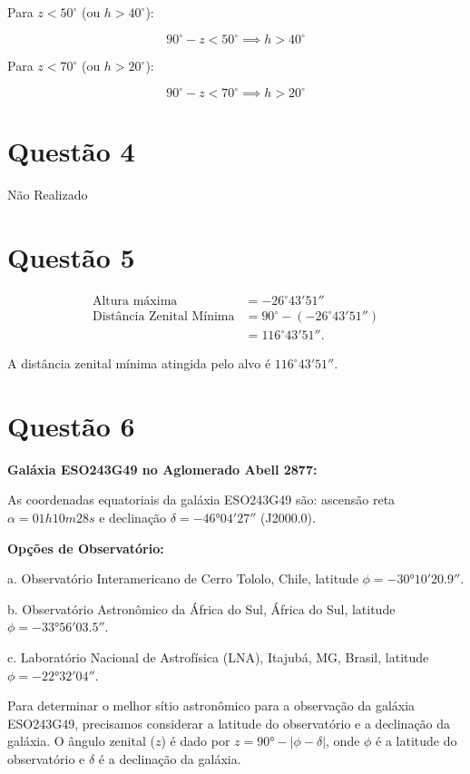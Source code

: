 \documentclass[a4paper, 12pt]{article}
\begin{document}
Para \(z < 50^\circ\) (ou \(h > 40^\circ\)):

\[
90^\circ - z < 50^\circ \implies h > 40^\circ
\]

Para \(z < 70^\circ\) (ou \(h > 20^\circ\)):

\[
90^\circ - z < 70^\circ \implies h > 20^\circ
\]

\section*{Questão 4}
Não Realizado

\section*{Questão 5}

\begin{align*}
\text{Altura máxima} &= -26^\circ 43' 51'' \\
\text{Distância Zenital Mínima} &= 90^\circ - (-26^\circ 43' 51'') \\
&= 116^\circ 43' 51''.
\end{align*}

A distância zenital mínima atingida pelo alvo é \(116^\circ 43' 51''\).

\section*{Questão 6}

\textbf{Galáxia ESO243G49 no Aglomerado Abell 2877:}

As coordenadas equatoriais da galáxia ESO243G49 são: ascensão reta \(\alpha = 01h10m28s\) e declinação \(\delta = -46°04'27''\) (J2000.0).

\textbf{Opções de Observatório:}

a. Observatório Interamericano de Cerro Tololo, Chile, latitude \(\phi = -30°10'20.9''\).

b. Observatório Astronômico da África do Sul, África do Sul, latitude \(\phi = -33°56'03.5''\).

c. Laboratório Nacional de Astrofísica (LNA), Itajubá, MG, Brasil, latitude \(\phi = -22°32'04''\).

Para determinar o melhor sítio astronômico para a observação da galáxia ESO243G49, precisamos considerar a latitude do observatório e a declinação da galáxia. O ângulo zenital (\(z\)) é dado por \(z = 90° - |\phi - \delta|\), onde \(\phi\) é a latitude do observatório e \(\delta\) é a declinação da galáxia.
\end{document}
